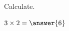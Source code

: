 \documentclass{ximera}
\begin{document}
                                                                   



                                       




                                    














\maketitle    
  Calculate.
\begin{question}  
$3\times 2 = \answer{6}$  
\end{question} 
\end{document}
